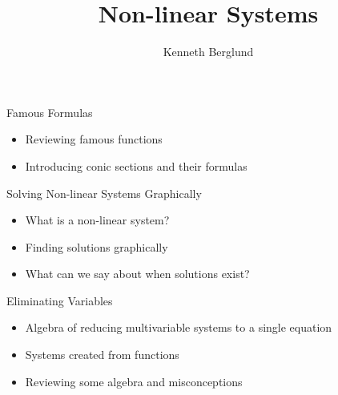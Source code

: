 \documentclass{ximera}
\author{Kenneth Berglund}
\title{Non-linear Systems}
\begin{document}
\begin{abstract}
\end{abstract}
\maketitle


\begin{objectives}
\item Famous Formulas
\begin{itemize}
	\item Reviewing famous functions
	\item Introducing conic sections and their formulas
\end{itemize}

\item Solving Non-linear Systems Graphically
\begin{itemize}
	\item What is a non-linear system?
	\item Finding solutions graphically
	\item What can we say about when solutions exist?
\end{itemize}

\item Eliminating Variables
\begin{itemize}
	\item Algebra of reducing multivariable systems to a single equation
	\item Systems created from functions
	\item Reviewing some algebra and misconceptions
\end{itemize}


\end{objectives}
\end{document}
